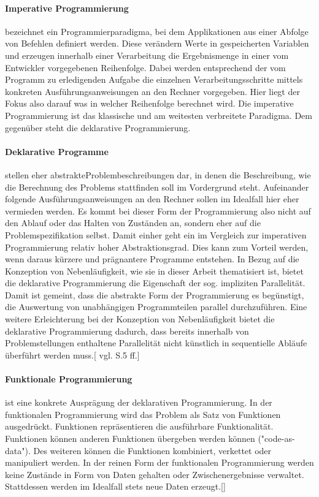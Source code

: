 \documentclass[12pt,oneside,a4paper,bibtotoc,liststotoc]{scrreprt}
\begin{document}
\paragraph{Imperative Programmierung} bezeichnet ein Programmierparadigma, bei dem Applikationen aus einer Abfolge von Befehlen definiert werden. Diese verändern Werte in gespeicherten Variablen und erzeugen innerhalb einer Verarbeitung die Ergebnismenge in einer vom Entwickler vorgegebenen Reihenfolge. Dabei werden entsprechend der vom Programm zu erledigenden Aufgabe die einzelnen Verarbeitungsschritte mittels konkreten Ausführungsanweisungen an den Rechner vorgegeben. Hier liegt der Fokus also darauf was in welcher Reihenfolge berechnet wird. Die imperative Programmierung ist das klassische und am weitesten verbreitete Paradigma. Dem gegenüber steht die deklarative Programmierung.

\paragraph{Deklarative Programme} stellen eher \glqq abstrakte\grqq Problembeschreibungen dar, in denen die Beschreibung, wie die Berechnung des Problems stattfinden soll im Vordergrund steht. Aufeinander folgende Ausführungsanweisungen an den Rechner sollen im Idealfall hier eher vermieden werden. Es kommt bei dieser Form der Programmierung also nicht auf den Ablauf oder das Halten von Zuständen an, sondern eher auf die Problemspezifikation selbst. Damit einher geht ein im Vergleich zur imperativen Programmierung relativ hoher Abstraktionsgrad. Dies kann zum Vorteil werden, wenn daraus kürzere und prägnantere Programme entstehen. In Bezug auf die Konzeption von Nebenläufigkeit, wie sie in dieser Arbeit thematisiert ist, bietet die deklarative Programmierung die Eigenschaft der sog. impliziten Parallelität. Damit ist gemeint, dass die abstrakte Form der Programmierung es begünstigt, die Auswertung von unabhängigen Programmteilen parallel durchzuführen. Eine weitere Erleichterung bei der Konzeption von Nebenläufigkeit bietet die deklarative Programmierung dadurch, dass bereits innerhalb von Problemstellungen enthaltene Parallelität nicht künstlich in sequentielle Abläufe überführt werden muss.[\citet {declarativProgrammingScript} vgl. S.5 ff.] 
\paragraph{Funktionale Programmierung} ist eine konkrete Ausprägung der deklarativen Programmierung. In der funktionalen Programmierung wird das Problem als Satz von Funktionen ausgedrückt. Funktionen repräsentieren die ausführbare Funktionalität. Funktionen können anderen Funktionen übergeben werden können ("code-as-data"). Des weiteren können die Funktionen kombiniert, verkettet oder manipuliert werden. In der reinen Form der funktionalen Programmierung werden keine Zustände in Form von Daten gehalten oder Zwischenergebnisse verwaltet. Stattdessen werden im Idealfall stets neue Daten erzeugt.[\citet{funcProgrJava}]   
\end{document}
